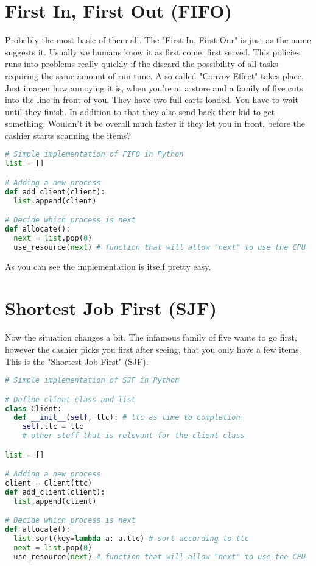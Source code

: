 \documentclass{report}
\begin{document}
\section{First In, First Out (FIFO)}

Probably the most basic of them all.
The "First In, First Our" is just as the name suggests it. 
Usually we humans know it as first come, first served. 
This policies runs into problems really quickly if the discard the possibility of all tasks requiring the same amount of run time. 
A so called "Convoy Effect" takes place. 
Just imagen how annoying it is, when you're at a store and a family of five cuts into the line in front of you. 
They have two full carts loaded. You have to wait until they finish. 
In addition to that they also send back their kid to get something. 
Wouldn't it be overall much faster if they let you in front, before the cashier starts scanning the items?

\begin{lstlisting}[language=Python, style=colorEX]
# Simple implementation of FIFO in Python
list = []

# Adding a new process
def add_client(client):
  list.append(client)

# Decide which process is next
def allocate():
  next = list.pop(0)
  use_resource(next) # function that will allow "next" to use the CPU
\end{lstlisting}

As you can see the implementation is itself pretty easy.
\pagebreak

\section{Shortest Job First (SJF)}

Now the situation changes a bit. 
The infamous family of five wants to go first, however the cashier picks you first after seeing, that you only have a few items.
This is the "Shortest Job First" (SJF). 

\begin{lstlisting}[language=Python, style=colorEX]
# Simple implementation of SJF in Python

# Define client class and list
class Client:
  def __init__(self, ttc): # ttc as time to completion
    self.ttc = ttc
    # other stuff that is relevant for the client class

list = []

# Adding a new process
client = Client(ttc) 
def add_client(client): 
  list.append(client)

# Decide which process is next
def allocate():
  list.sort(key=lambda a: a.ttc) # sort according to ttc
  next = list.pop(0)
  use_resource(next) # function that will allow "next" to use the CPU
\end{lstlisting}
\end{document}
